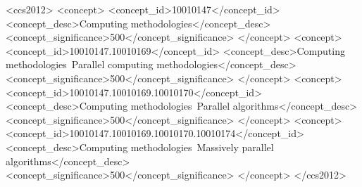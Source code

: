 
 
\acmISBN{} %
\acmDOI{} %
\begin{CCSXML}
<ccs2012>
<concept>
<concept_id>10010147</concept_id>
<concept_desc>Computing methodologies</concept_desc>
<concept_significance>500</concept_significance>
</concept>
<concept>
<concept_id>10010147.10010169</concept_id>
<concept_desc>Computing methodologies~Parallel computing methodologies</concept_desc>
<concept_significance>500</concept_significance>
</concept>
<concept>
<concept_id>10010147.10010169.10010170</concept_id>
<concept_desc>Computing methodologies~Parallel algorithms</concept_desc>
<concept_significance>500</concept_significance>
</concept>
<concept>
<concept_id>10010147.10010169.10010170.10010174</concept_id>
<concept_desc>Computing methodologies~Massively parallel algorithms</concept_desc>
<concept_significance>500</concept_significance>
</concept>
</ccs2012>
\end{CCSXML}





